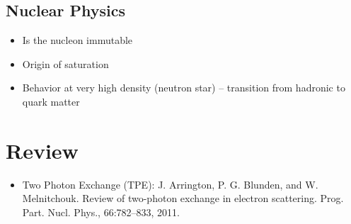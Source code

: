 \documentclass{report}
\begin{document}
\subsection{Nuclear Physics}
\begin{itemize}
    \item Is the nucleon immutable
    \item Origin of saturation
    \item Behavior at very high density (neutron star) -- transition from hadronic to quark matter
\end{itemize}

\section{Review}
\begin{itemize}
    \item Two Photon Exchange (TPE): J. Arrington, P. G. Blunden, and W. Melnitchouk. Review of two-photon exchange in electron scattering. Prog. Part. Nucl. Phys., 66:782–833, 2011.
\end{itemize}
\end{document}

